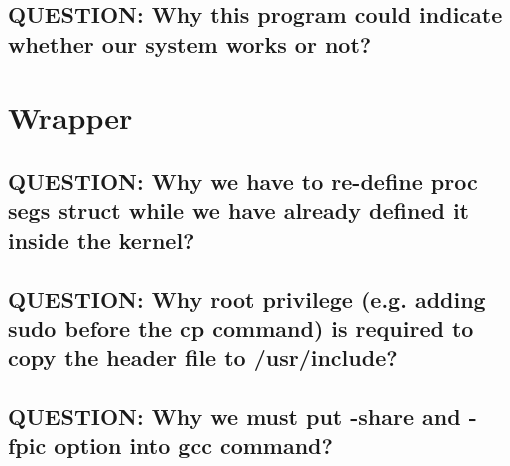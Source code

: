 \subsection{QUESTION: Why this program could indicate whether our system works or not?}



\section{Wrapper}

\subsection{QUESTION: Why we have to re-define proc segs struct while we have already defined it inside the kernel?}



\subsection{QUESTION: Why root privilege (e.g. adding sudo before the cp command) is required to copy the header file to /usr/include?}


\subsection{QUESTION: Why we must put -share and -fpic option into gcc command?}

